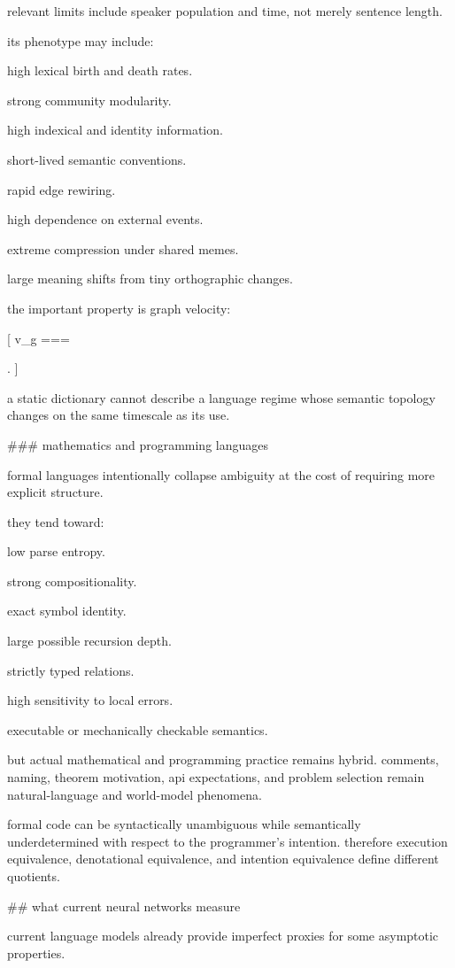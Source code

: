 relevant limits include speaker population and time, not merely sentence length.

its phenotype may include:

high lexical birth and death rates.

strong community modularity.

high indexical and identity information.

short-lived semantic conventions.

rapid edge rewiring.

high dependence on external events.

extreme compression under shared memes.

large meaning shifts from tiny orthographic changes.

the important property is graph velocity:

[
v_g
===

{}.
]

a static dictionary cannot describe a language regime whose semantic topology changes on the same timescale as its use.

### mathematics and programming languages

formal languages intentionally collapse ambiguity at the cost of requiring more explicit structure.

they tend toward:

low parse entropy.

strong compositionality.

exact symbol identity.

large possible recursion depth.

strictly typed relations.

high sensitivity to local errors.

executable or mechanically checkable semantics.

but actual mathematical and programming practice remains hybrid. comments, naming, theorem motivation, api expectations, and problem selection remain natural-language and world-model phenomena.

formal code can be syntactically unambiguous while semantically underdetermined with respect to the programmer’s intention. therefore execution equivalence, denotational equivalence, and intention equivalence define different quotients.

## what current neural networks measure

current language models already provide imperfect proxies for some asymptotic properties.

